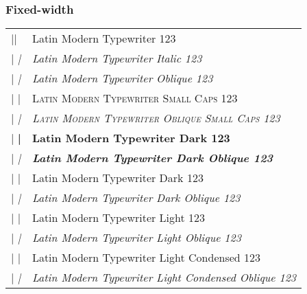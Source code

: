 \documentclass{article}
\makeatletter
\newenvironment{vrb}{\begin{tabular}{@{}p{6cm}l@{}}}{\end{tabular}}
\makeatother
\begin{document}
\subsubsection*{Fixed-width}

\tmstyle
\begin{vrb}
|\tmstyle | & {Latin Modern Typewriter 123} \\
|   \itshape | & {\itshape Latin Modern Typewriter Italic 123} \\
|   \slshape | & {\slshape Latin Modern Typewriter Oblique 123} \\
|   \scshape | & {\scshape Latin Modern Typewriter Small Caps 123} \\
|   \scshape\slshape | & {\scshape\slshape Latin Modern Typewriter Oblique Small Caps 123} \\
|   \bfseries | & {\bfseries Latin Modern Typewriter Dark 123} \\
|      \slshape | & {\bfseries\slshape Latin Modern Typewriter Dark Oblique 123} \\
|   \fontseries{b}\selectfont | & {\fontseries{b}\selectfont Latin Modern Typewriter Dark 123} \\
|      \slshape | & {\fontseries{b}\slshape Latin Modern Typewriter Dark Oblique 123} \\
|   \lgweight | & {\lgweight Latin Modern Typewriter Light 123} \\
|   \lgweight\slshape | & {\lgweight\slshape Latin Modern Typewriter Light Oblique 123} \\
|   \fontseries{lc}\selectfont | & {\fontseries{lc}\selectfont Latin Modern Typewriter Light Condensed 123} \\
|      \slshape | & {\fontseries{lc}\slshape Latin Modern Typewriter Light Condensed Oblique 123} \\
\end{vrb}
\end{document}
